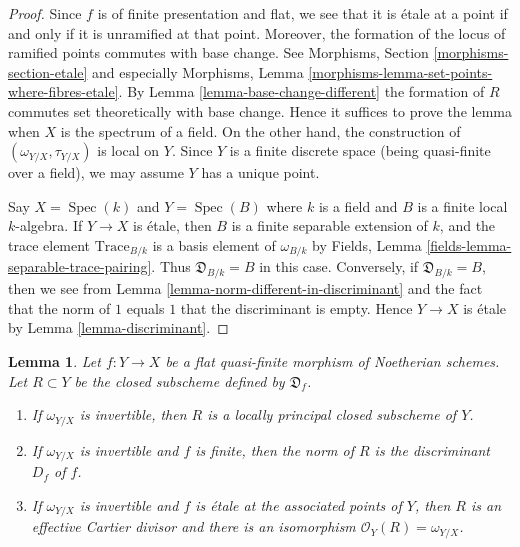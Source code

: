 \documentclass{stacks-project}
\theoremstyle{plain}
\newtheorem{lemma}[subsection]{Lemma}
\theoremstyle{definition}
\theoremstyle{remark}
\numberwithin{equation}{subsection}
\def\Spec{\mathop{\mathrm{Spec}}}
\begin{document}
\begin{proof}
Since $f$ is of finite presentation and flat, we see that it is \'etale
at a point if and only if it is unramified at that point. Moreover, the
formation of the locus of ramified points commutes with base change.
See Morphisms, Section \ref{morphisms-section-etale} and especially
Morphisms, Lemma \ref{morphisms-lemma-set-points-where-fibres-etale}.
By Lemma \ref{lemma-base-change-different} the formation of $R$ commutes
set theoretically with base change. Hence it suffices to prove the
lemma when $X$ is the spectrum of a field. On the other hand, the
construction of $(\omega_{Y/X}, \tau_{Y/X})$ is local on $Y$.
Since $Y$ is a finite discrete space (being quasi-finite
over a field), we may assume $Y$ has a unique point.

\medskip\noindent
Say $X = \Spec(k)$ and $Y = \Spec(B)$ where $k$ is a field and $B$ is
a finite local $k$-algebra. If $Y \to X$ is \'etale, then
$B$ is a finite separable extension of $k$, and the trace
element $\text{Trace}_{B/k}$ is a basis element of $\omega_{B/k}$
by Fields, Lemma \ref{fields-lemma-separable-trace-pairing}.
Thus $\mathfrak{D}_{B/k} = B$ in this case.
Conversely, if $\mathfrak{D}_{B/k} = B$, then we see from
Lemma \ref{lemma-norm-different-in-discriminant}
and the fact that the norm of $1$ equals $1$ that the
discriminant is empty. Hence
$Y \to X$ is \'etale by Lemma \ref{lemma-discriminant}.
\end{proof}

\begin{lemma}
\label{lemma-norm-different-is-discriminant}
Let $f : Y \to X$ be a flat quasi-finite morphism of Noetherian schemes.
Let $R \subset Y$ be the closed subscheme defined by $\mathfrak{D}_f$.
\begin{enumerate}
\item If $\omega_{Y/X}$ is invertible,
then $R$ is a locally principal closed subscheme of $Y$.
\item If $\omega_{Y/X}$ is invertible and $f$ is finite, then
the norm of $R$ is the discriminant $D_f$ of $f$.
\item If $\omega_{Y/X}$ is invertible and $f$
is \'etale at the associated points of $Y$, then $R$
is an effective Cartier divisor and there is an
isomorphism $\mathcal{O}_Y(R) = \omega_{Y/X}$.
\end{enumerate}
\end{lemma}
\end{document}
